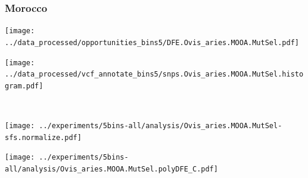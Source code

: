 \subsubsection{Morocco}

\begin{minipage}{0.49\linewidth}
    \texttt{[image: ../data\_processed/opportunities\_bins5/DFE.Ovis\_aries.MOOA.MutSel.pdf]}
\end{minipage}
\begin{minipage}{0.49\linewidth}
    \texttt{[image: ../data\_processed/vcf\_annotate\_bins5/snps.Ovis\_aries.MOOA.MutSel.histogram.pdf]}
\end{minipage}
\\
\begin{minipage}{0.49\linewidth}
    \texttt{[image: ../experiments/5bins-all/analysis/Ovis\_aries.MOOA.MutSel-sfs.normalize.pdf]}
\end{minipage}
\begin{minipage}{0.49\linewidth}
    \texttt{[image: ../experiments/5bins-all/analysis/Ovis\_aries.MOOA.MutSel.polyDFE\_C.pdf]}
\end{minipage}
\\
